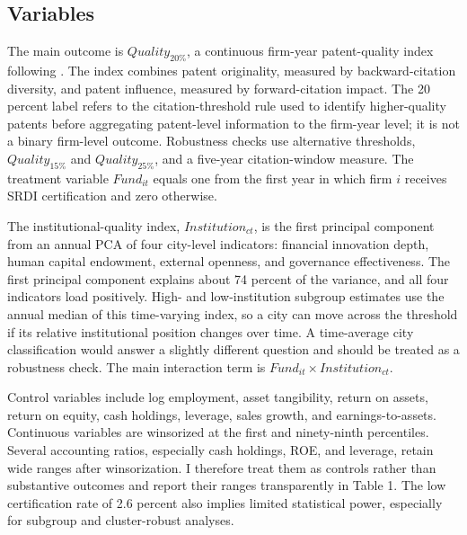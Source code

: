 \documentclass[12pt]{article}
\begin{document}
\subsection{Variables}

The main outcome is \(\textit{Quality}_{20\%}\), a continuous firm-year patent-quality index following \citet{li2026}. The index combines patent originality, measured by backward-citation diversity, and patent influence, measured by forward-citation impact. The 20 percent label refers to the citation-threshold rule used to identify higher-quality patents before aggregating patent-level information to the firm-year level; it is not a binary firm-level outcome. Robustness checks use alternative thresholds, \(\textit{Quality}_{15\%}\) and \(\textit{Quality}_{25\%}\), and a five-year citation-window measure. The treatment variable \(\textit{Fund}_{it}\) equals one from the first year in which firm \(i\) receives SRDI certification and zero otherwise.

The institutional-quality index, \(\textit{Institution}_{ct}\), is the first principal component from an annual PCA of four city-level indicators: financial innovation depth, human capital endowment, external openness, and governance effectiveness. The first principal component explains about 74 percent of the variance, and all four indicators load positively. High- and low-institution subgroup estimates use the annual median of this time-varying index, so a city can move across the threshold if its relative institutional position changes over time. A time-average city classification would answer a slightly different question and should be treated as a robustness check. The main interaction term is \(\textit{Fund}_{it} \times \textit{Institution}_{ct}\).

Control variables include log employment, asset tangibility, return on assets, return on equity, cash holdings, leverage, sales growth, and earnings-to-assets. Continuous variables are winsorized at the first and ninety-ninth percentiles. Several accounting ratios, especially cash holdings, ROE, and leverage, retain wide ranges after winsorization. I therefore treat them as controls rather than substantive outcomes and report their ranges transparently in Table 1. The low certification rate of 2.6 percent also implies limited statistical power, especially for subgroup and cluster-robust analyses.
\end{document}
